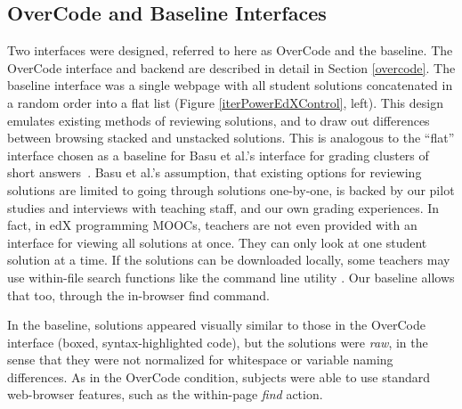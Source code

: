 \subsection{OverCode and Baseline Interfaces}

Two interfaces were designed, referred to here as OverCode and the baseline. The OverCode interface and backend are described in detail in Section \ref{overcode}. The baseline interface was a single webpage with all student solutions concatenated in a random order into a flat list (Figure \ref{iterPowerEdXControl}, left). This design emulates existing methods of reviewing solutions, and to draw out differences between browsing stacked and unstacked solutions. This is analogous to the ``flat'' interface chosen as a baseline for Basu et al.'s interface for grading clusters of short answers~\cite{basuDivideAndConquer}. Basu et al.'s assumption, that existing options for reviewing solutions are limited to going through solutions one-by-one, is backed by our pilot studies and interviews with teaching staff, and our own grading experiences. In fact, in edX programming MOOCs, teachers are not even provided with an interface for viewing all solutions at once. They can only look at one student solution at a time. If the solutions can be downloaded locally, some teachers may use within-file search functions like the command line utility . Our baseline allows that too, through the in-browser find command. 

In the baseline, solutions appeared visually similar to those in the OverCode interface (boxed, syntax-highlighted code), but the solutions were \emph{raw}, in the sense that they were not normalized for whitespace or variable naming differences. As in the OverCode condition, subjects were able to use standard web-browser features, such as the within-page \emph{find} action.


